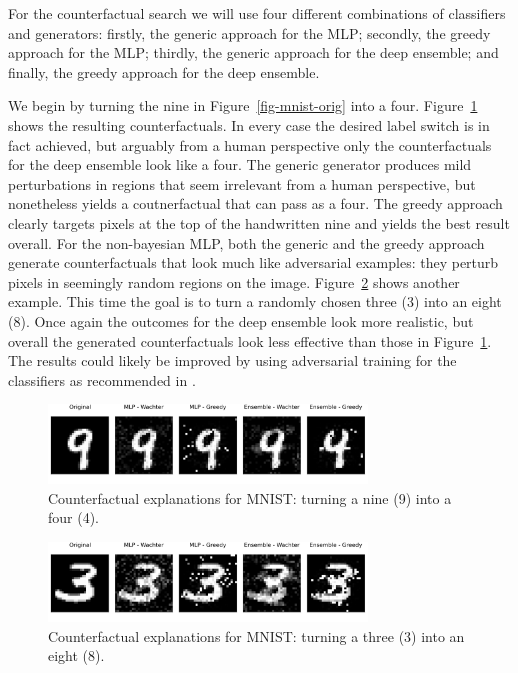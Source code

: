 \documentclass[
  letterpaper,
  DIV=11,
  numbers=noendperiod]{scrartcl}
\begin{document}
For the counterfactual search we will use four different combinations of
classifiers and generators: firstly, the generic approach for the MLP;
secondly, the greedy approach for the MLP; thirdly, the generic approach
for the deep ensemble; and finally, the greedy approach for the deep
ensemble.

We begin by turning the nine in Figure~\ref{fig-mnist-orig} into a four.
Figure~\ref{fig-mnist-9to4} shows the resulting counterfactuals. In
every case the desired label switch is in fact achieved, but arguably
from a human perspective only the counterfactuals for the deep ensemble
look like a four. The generic generator produces mild perturbations in
regions that seem irrelevant from a human perspective, but nonetheless
yields a coutnerfactual that can pass as a four. The greedy approach
\cite{schut2021generating} clearly targets pixels at the top of the
handwritten nine and yields the best result overall. For the
non-bayesian MLP, both the generic and the greedy approach generate
counterfactuals that look much like adversarial examples: they perturb
pixels in seemingly random regions on the image.
Figure~\ref{fig-mnist-3to8} shows another example. This time the goal is
to turn a randomly chosen three (3) into an eight (8). Once again the
outcomes for the deep ensemble look more realistic, but overall the
generated counterfactuals look less effective than those in
Figure~\ref{fig-mnist-9to4}. The results could likely be improved by
using adversarial training for the classifiers as recommended in
\cite{schut2021generating}.

\begin{figure}

{\centering \includegraphics[width=3.33333in,height=0.83333in]{www/mnist_9_to_4.png}

}

\caption{\label{fig-mnist-9to4}Counterfactual explanations for MNIST:
turning a nine (9) into a four (4).}

\end{figure}

\begin{figure}

{\centering \includegraphics[width=3.33333in,height=0.83333in]{www/mnist_3_to_8.png}

}

\caption{\label{fig-mnist-3to8}Counterfactual explanations for MNIST:
turning a three (3) into an eight (8).}

\end{figure}
\end{document}
